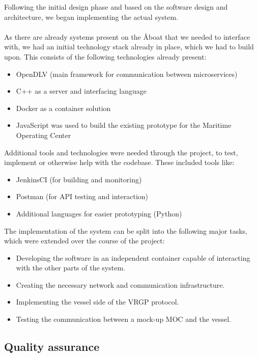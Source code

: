 Following the initial design phase and based on the software design and architecture, we began implementing the actual system.
\\\\
As there are already systems present on the Åboat that we needed to interface with, we had an initial technology stack already in place, which we had to build upon. This consists of the following technologies already present:

\begin{itemize}
	\item OpenDLV (main framework for communication between microservices)
	\item C++ as a server and interfacing language
	\item Docker as a container solution
	\item JavaScript was used to build the existing prototype for the Maritime Operating Center
\end{itemize}

\noindent
Additional tools and technologies were needed through the project, to test, implement or otherwise help with the codebase. These included tools like:

\begin{itemize}
	\item JenkinsCI (for building and monitoring)
	\item Postman (for API testing and interaction)
	\item Additional languages for easier prototyping (Python)
\end{itemize}

\noindent
The implementation of the system can be split into the following major tasks, which were extended over the course of the project:

\begin{itemize}
	\item Developing the software in an independent container capable of interacting with the other parts of the system.
	\item Creating the necessary network and communication infrastructure.
	\item Implementing the vessel side of the VRGP protocol.
	\item Testing the communication between a mock-up MOC and the vessel.
\end{itemize}

\subsection{Quality assurance}\label{sec:quality}


